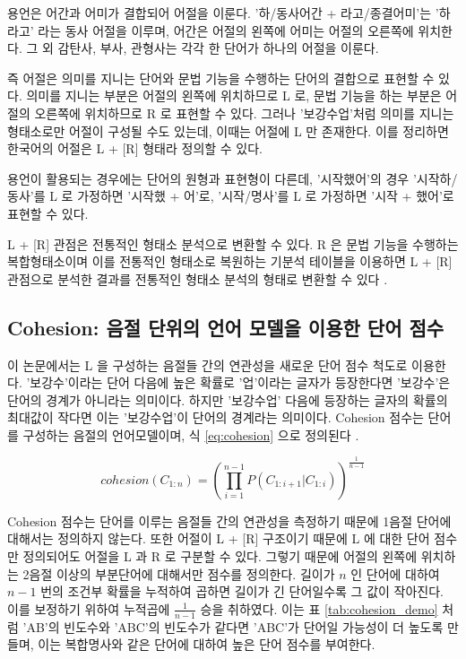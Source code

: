 \documentclass[oneside, ko,phd]{snuthesis_utf8_kor}
\begin{document}
용언은 어간과 어미가 결합되어 어절을 이룬다.
'하/동사어간 + 라고/종결어미'는 '하라고' 라는 동사 어절을 이루며, 어간은 어절의 왼쪽에 어미는 어절의 오른쪽에 위치한다.
그 외 감탄사, 부사, 관형사는 각각 한 단어가 하나의 어절을 이룬다.

즉 어절은 의미를 지니는 단어와 문법 기능을 수행하는 단어의 결합으로 표현할 수 있다.
의미를 지니는 부분은 어절의 왼쪽에 위치하므로 L 로, 문법 기능을 하는 부분은 어절의 오른쪽에 위치하므로 R 로 표현할 수 있다.
그러나 '보강수업'처럼 의미를 지니는 형태소로만 어절이 구성될 수도 있는데, 이때는 어절에 L 만 존재한다.
이를 정리하면 한국어의 어절은 L + [R] 형태라 정의할 수 있다.

용언이 활용되는 경우에는 단어의 원형과 표현형이 다른데, '시작했어'의 경우 '시작하/동사'를 L 로 가정하면 '시작했 + 어'로, '시작/명사'를 L 로 가정하면 '시작 + 했어'로 표현할 수 있다.

L + [R] 관점은 전통적인 형태소 분석으로 변환할 수 있다.
R 은 문법 기능을 수행하는 복합형태소이며 이를 전통적인 형태소로 복원하는 기분석 테이블을 이용하면 L + [R] 관점으로 분석한 결과를 전통적인 형태소 분석의 형태로 변환할 수 있다 \cite{shim2013syllable}.

\subsection{Cohesion: 음절 단위의 언어 모델을 이용한 단어 점수}
이 논문에서는 L 을 구성하는 음절들 간의 연관성을 새로운 단어 점수 척도로 이용한다.
'보강수'이라는 단어 다음에 높은 확률로 '업'이라는 글자가 등장한다면 '보강수'은 단어의 경계가 아니라는 의미이다.
하지만 '보강수업' 다음에 등장하는 글자의 확률의 최대값이 작다면 이는 '보강수업'이 단어의 경계라는 의미이다.
Cohesion 점수는 단어를 구성하는 음절의 언어모델이며, 식 \ref{eq:cohesion} 으로 정의된다 \cite{kim2013cleansing}.

\begin{equation}
\label{eq:cohesion}
cohesion(C_{1:n}) = \left( \prod_{i=1}^{n-1} P(C_{1:i+1} \vert C_{1:i}) \right) ^ {\frac{1}{n-1}} 
\end{equation}

Cohesion 점수는 단어를 이루는 음절들 간의 연관성을 측정하기 때문에 1음절 단어에 대해서는 정의하지 않는다.
또한 어절이 L + [R] 구조이기 때문에 L 에 대한 단어 점수만 정의되어도 어절을 L 과 R 로 구분할 수 있다.
그렇기 때문에 어절의 왼쪽에 위치하는 2음절 이상의 부분단어에 대해서만 점수를 정의한다.
길이가 $n$ 인 단어에 대하여 $n-1$ 번의 조건부 확률을 누적하여 곱하면 길이가 긴 단어일수록 그 값이 작아진다.
이를 보정하기 위하여 누적곱에 $\frac{1}{n-1}$ 승을 취하였다.
이는 표 \ref{tab:cohesion_demo} 처럼 'AB'의 빈도수와 'ABC'의 빈도수가 같다면 'ABC'가 단어일 가능성이 더 높도록 만들며, 이는 복합명사와 같은 단어에 대하여 높은 단어 점수를 부여한다.
\end{document}
